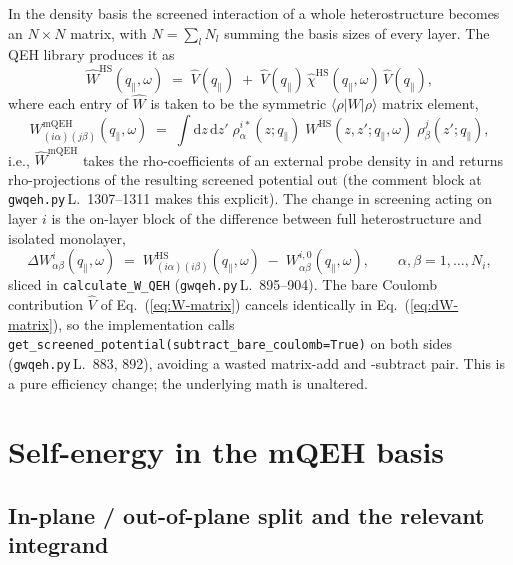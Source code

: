 \documentclass[11pt,a4paper]{article}
\newcommand{\dd}{\mathrm{d}}
\newcommand{\Heter}{\text{HS}}
\newcommand{\eq}[1]{Eq.~(\ref{eq:#1})}
\begin{document}
In the density basis the screened interaction of a whole
heterostructure becomes an $N\times N$ matrix, with
$N = \sum_{l} N_l$ summing the basis sizes of every layer.  The QEH
library produces it as
\begin{equation}
\hat W^{\Heter}(q_\parallel,\omega)
\;=\; \hat V(q_\parallel) \;+\;
\hat V(q_\parallel)\,\hat\chi^{\Heter}(q_\parallel,\omega)\,
\hat V(q_\parallel),
\label{eq:W-matrix}
\end{equation}
where each entry of $\hat W$ is taken to be the symmetric
$\langle\rho|W|\rho\rangle$ matrix element,
\begin{equation}
W^{\text{mQEH}}_{(i\alpha)(j\beta)}(q_\parallel,\omega)
\;=\; \int\!\dd z\,\dd z'\;
\rho^{i*}_{\alpha}(z;q_\parallel)\;
W^{\Heter}(z,z';q_\parallel,\omega)\;
\rho^{j}_{\beta}(z';q_\parallel),
\label{eq:WmQEH-def}
\end{equation}
i.e., $\hat W^{\text{mQEH}}$ takes the rho-coefficients of an external
probe density in and returns rho-projections of the resulting
screened potential out (the comment block at \texttt{gwqeh.py}\,L.~1307--1311
makes this explicit).  The change in screening acting on layer $i$ is
the on-layer block of the difference between full heterostructure and
isolated monolayer,
\begin{equation}
\Delta W^{i}_{\alpha\beta}(q_\parallel,\omega)\;=\;
W^{\Heter}_{(i\alpha)(i\beta)}(q_\parallel,\omega)
\;-\;W^{i,0}_{\alpha\beta}(q_\parallel,\omega),
\qquad \alpha,\beta=1,\ldots,N_i,
\label{eq:dW-matrix}
\end{equation}
sliced in \texttt{calculate\_W\_QEH} (\texttt{gwqeh.py}\,L.~895--904).
The bare Coulomb contribution $\hat V$ of \eq{W-matrix} cancels
identically in \eq{dW-matrix}, so the implementation calls
\texttt{get\_screened\_potential(subtract\_bare\_coulomb=True)} on
both sides (\texttt{gwqeh.py}\,L.~883, 892), avoiding a wasted
matrix-add and -subtract pair.  This is a pure efficiency change; the
underlying math is unaltered.

\section{Self-energy in the mQEH basis}

\subsection{In-plane / out-of-plane split and the relevant integrand}
\end{document}

